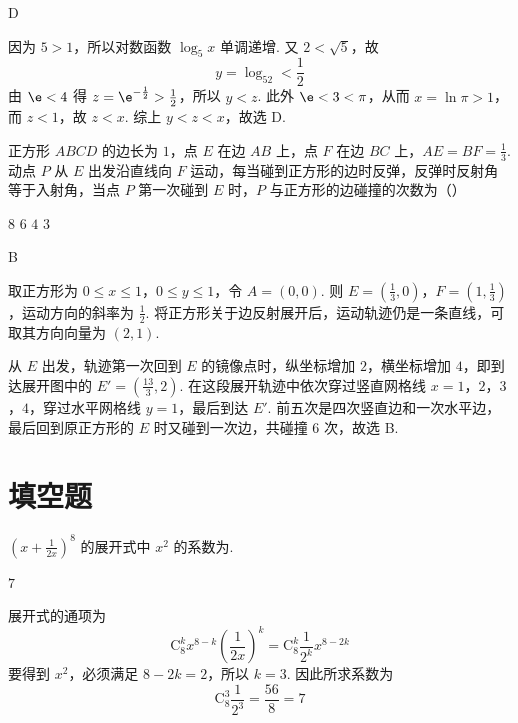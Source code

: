 \begin{answer}
D
\end{answer}

\begin{solution}
因为 \(5>1\)，所以对数函数 \(\log_5x\) 单调递增. 又 \(2<\sqrt5\)，故
\[
y=\log_52<\frac12
\]
由 \(\e<4\) 得 \(z=\e^{-\frac{1}{2}}>\frac12\)，所以 \(y<z\). 此外 \(\e<3<\pi\)，从而 \(x=\ln\pi>1\)，而 \(z<1\)，故 \(z<x\). 综上 \(y<z<x\)，故选 D.
\end{solution}

\begin{problem}
正方形 \(ABCD\) 的边长为 \(1\)，点 \(E\) 在边 \(AB\) 上，点 \(F\) 在边 \(BC\) 上，\(AE = BF = \frac{1}{3}\). 动点 \(P\) 从 \(E\) 出发沿直线向 \(F\) 运动，每当碰到正方形的边时反弹，反弹时反射角等于入射角，当点 \(P\) 第一次碰到 \(E\) 时，\(P\) 与正方形的边碰撞的次数为（\quad）

\choices
    {\(8\)}
    {\(6\)}
    {\(4\)}
    {\(3\)}
\end{problem}

\begin{answer}
B
\end{answer}

\begin{solution}
取正方形为 \(0\leqslant x\leqslant1\)，\(0\leqslant y\leqslant1\)，令 \(A=(0,0)\). 则 \(E=(\frac13,0)\)，\(F=(1,\frac13)\)，运动方向的斜率为 \(\frac12\). 将正方形关于边反射展开后，运动轨迹仍是一条直线，可取其方向向量为 \((2,1)\).

从 \(E\) 出发，轨迹第一次回到 \(E\) 的镜像点时，纵坐标增加 \(2\)，横坐标增加 \(4\)，即到达展开图中的 \(E'=(\frac{13}{3},2)\). 在这段展开轨迹中依次穿过竖直网格线 \(x=1\)，\(2\)，\(3\)，\(4\)，穿过水平网格线 \(y=1\)，最后到达 \(E'\). 前五次是四次竖直边和一次水平边，最后回到原正方形的 \(E\) 时又碰到一次边，共碰撞 \(6\) 次，故选 B.
\end{solution}

\section{填空题}

\begin{problem}
\(\left(x + \frac{1}{2x}\right)^8\) 的展开式中 \(x^2\) 的系数为\fillinblank{}.
\end{problem}

\begin{answer}
\(7\)
\end{answer}

\begin{solution}
展开式的通项为
\[
\mathrm C_8^k x^{8-k}\left(\frac{1}{2x}\right)^k
=\mathrm C_8^k\frac{1}{2^k}x^{8-2k}
\]
要得到 \(x^2\)，必须满足 \(8-2k=2\)，所以 \(k=3\). 因此所求系数为
\[
\mathrm C_8^3\frac{1}{2^3}=\frac{56}{8}=7
\]
\end{solution}

